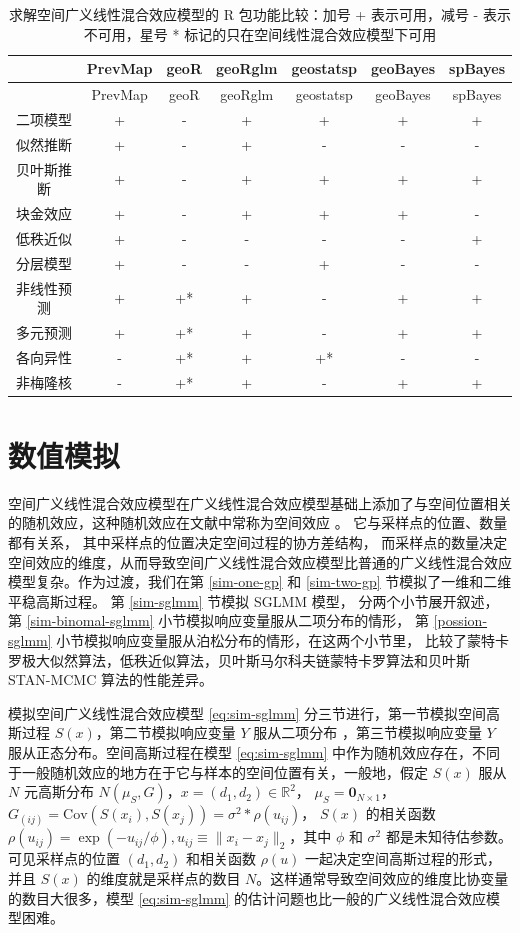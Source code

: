 \documentclass[12pt,a4paper,UTF8,twoside]{book}
\theoremstyle{definition}
\theoremstyle{definition}
\theoremstyle{definition}
\theoremstyle{remark}
\begin{document}
\begin{longtable}[]{@{}ccccccc@{}}
\caption{\label{tab:sglmm-packages} 求解空间广义线性混合效应模型的 R
包功能比较：加号 + 表示可用，减号 - 表示不可用，星号 *
标记的只在空间线性混合效应模型下可用}\tabularnewline
\toprule
& PrevMap & geoR & geoRglm & geostatsp & geoBayes &
spBayes\tabularnewline
\midrule
\endfirsthead
\toprule
& PrevMap & geoR & geoRglm & geostatsp & geoBayes &
spBayes\tabularnewline
\midrule
\endhead
二项模型 & + & - & + & + & + & +\tabularnewline
似然推断 & + & - & + & - & - & -\tabularnewline
贝叶斯推断 & + & - & + & + & + & +\tabularnewline
块金效应 & + & - & + & + & + & -\tabularnewline
低秩近似 & + & - & - & - & - & +\tabularnewline
分层模型 & + & - & - & + & - & -\tabularnewline
非线性预测 & + & +* & + & - & + & +\tabularnewline
多元预测 & + & +* & + & - & + & +\tabularnewline
各向异性 & - & +* & + & +* & - & -\tabularnewline
非梅隆核 & - & +* & + & - & + & +\tabularnewline
\bottomrule
\end{longtable}

\hypertarget{simulations}{%
\chapter{数值模拟}\label{simulations}}

空间广义线性混合效应模型在广义线性混合效应模型基础上添加了与空间位置相关的随机效应，这种随机效应在文献中常称为空间效应
\citep{Diggle1998}。 它与采样点的位置、数量都有关系，
其中采样点的位置决定空间过程的协方差结构，
而采样点的数量决定空间效应的维度，从而导致空间广义线性混合效应模型比普通的广义线性混合效应模型复杂。作为过渡，我们在第
\ref{sim-one-gp} 和 \ref{sim-two-gp} 节模拟了一维和二维平稳高斯过程。 第
\ref{sim-sglmm} 节模拟 SGLMM 模型， 分两个小节展开叙述，第
\ref{sim-binomal-sglmm} 小节模拟响应变量服从二项分布的情形， 第
\ref{possion-sglmm} 小节模拟响应变量服从泊松分布的情形，在这两个小节里，
比较了蒙特卡罗极大似然算法，低秩近似算法，贝叶斯马尔科夫链蒙特卡罗算法和贝叶斯
STAN-MCMC 算法的性能差异。

模拟空间广义线性混合效应模型 \eqref{eq:sim-sglmm}
分三节进行，第一节模拟空间高斯过程 \(S(x)\)，第二节模拟响应变量 \(Y\)
服从二项分布 ，第三节模拟响应变量 \(Y\) 服从正态分布。空间高斯过程在模型
\eqref{eq:sim-sglmm}
中作为随机效应存在，不同于一般随机效应的地方在于它与样本的空间位置有关，一般地，假定
\(S(x)\) 服从 \(N\) 元高斯分布
\(N(\mu_{S},G)\)，\(x = (d_1,d_2) \in \mathbb{R}^2\)，
\(\mu_{S} = \mathbf{0}_{N\times1}\)，
\(G_{(ij)} = \mathrm{Cov}(S(x_i),S(x_j))=\sigma^2*\rho(u_{ij})\)，
\(S(x)\) 的相关函数
\(\rho(u_{ij}) = \exp(-u_{ij}/\phi), u_{ij} \equiv \|x_{i}-x_{j}\|_2\)，其中
\(\phi\) 和 \(\sigma^2\) 都是未知待估参数。可见采样点的位置
\((d_1,d_2)\) 和相关函数 \(\rho(u)\) 一起决定空间高斯过程的形式，并且
\(S(x)\) 的维度就是采样点的数目
\(N\)。这样通常导致空间效应的维度比协变量的数目大很多，模型
\eqref{eq:sim-sglmm} 的估计问题也比一般的广义线性混合效应模型困难。
\end{document}
